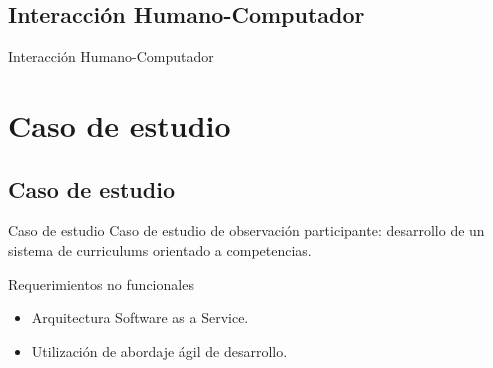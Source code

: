 \documentclass[10pt,xcolor=table ]{beamer}
\begin{document}
\subsection{Interacción Humano-Computador}
\begin{frame}{Interacción Humano-Computador}

\end{frame}

\section{Caso de estudio}
\subsection{Caso de estudio}
\begin{frame}{Caso de estudio}
  	Caso de estudio de observación participante: desarrollo de un sistema de curriculums orientado a competencias.

	\begin{block}{Requerimientos no funcionales}
		\begin{itemize}
			\item Arquitectura Software as a Service.
			\item Utilización de abordaje ágil de desarrollo.
    	\end{itemize}
	\end{block}
\end{frame}
\end{document}
